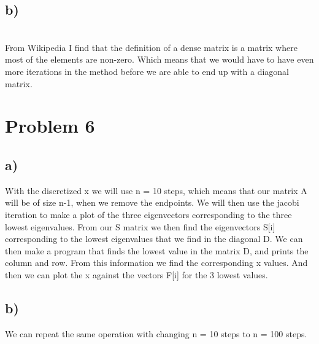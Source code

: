 \documentclass[english,notitlepage]{revtex4-1}  %
\begin{document}
\subsection*{b)}\
\\
From Wikipedia I find that the definition of a dense matrix is a matrix where most of the elements are non-zero. Which means that we would have to have even more iterations in the method before we are able to end up with a diagonal matrix. 


\section*{Problem 6}
\subsection*{a)}
With the discretized x we will use n = 10 steps, which means that our matrix A will be of size n-1, when we remove the endpoints. We will then use the jacobi iteration to make a plot of the three eigenvectors corresponding to the three lowest eigenvalues. From our S matrix we then find the eigenvectors S[i] corresponding to the lowest eigenvalues that we find in the diagonal D. We can then make a program that finds the lowest value in the matrix D, and prints the column and row. From this information we find the corresponding x values. And then we can plot the x against the vectors F[i] for the 3 lowest values. 


\subsection*{b)}
We can repeat the same operation with changing n = 10 steps to n = 100 steps. 





















   
\end{document}
